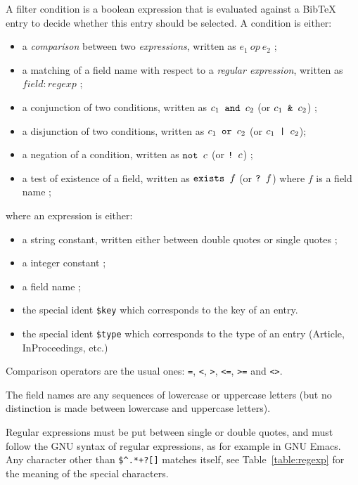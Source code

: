 \documentclass[11pt,a4paper]{article}
\begin{document}
A filter condition is a boolean expression that is evaluated against a
BibTeX entry to decide whether this entry should be selected. A
condition is either:
\begin{itemize}
\item a \emph{comparison} between two \emph{expressions}, written as
  $e_1~op~e_2$ ; 
\item a matching of a field name with respect to a \emph{regular
    expression}, written as $field : regexp$ ; 
\item a conjunction of two conditions, written as $c_1 \verb| and |
  c_2$ (or $c_1 \verb| & | c_2$) ;
\item a disjunction of two conditions, written as $c_1 \verb| or |
  c_2$ (or $c_1 \verb+ | + c_2$);
\item a negation of a condition, written as $\verb|not | c$ (or
  $\verb|! | c$) ;
\item a test of existence of a field, written as $\verb|exists | f$
  (or $\verb|? | f$) where $f$ is a field name ;
\end{itemize}
where an expression is either:
\begin{itemize}
\item a string constant, written either between double quotes or single 
  quotes ; 
\item a integer constant ;
\item a field name ;
\item the special ident \verb|$key| which corresponds to the key of
  an entry. 
\item the special ident \verb|$type| which corresponds to the type
  of an entry (Article, InProceedings, etc.)
\end{itemize} 

Comparison operators are the usual ones: \texttt{=}, \texttt{<},
\texttt{>}, \texttt{<=}, \texttt{>=} and \texttt{<>}. 

The field names are any sequences of lowercase or uppercase letters (but no
distinction is made between lowercase and uppercase letters).

Regular expressions must be put between single or double quotes, and must
follow the GNU syntax of regular expressions, as for example in GNU Emacs. Any
character other than \verb|$^.*+?[]| matches itself, see
Table~\ref{table:regexp} for the meaning of the special characters.
\end{document}
